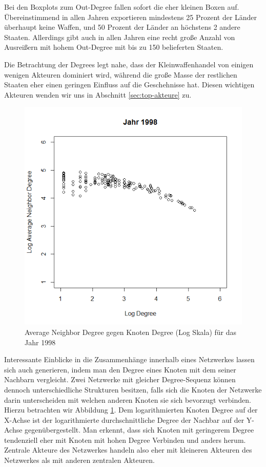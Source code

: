 \documentclass[a4paper,ngerman,oneside,titlepage,bibliography=totoc,11pt]{scrreprt}
\begin{document}
Bei den Boxplots zum Out-Degree fallen sofort die eher kleinen Boxen auf. Übereinstimmend in allen Jahren exportieren mindestens 25 Prozent der Länder überhaupt keine Waffen, und 50 Prozent der Länder an höchstens 2 andere Staaten. Allerdings gibt auch in allen Jahren eine recht große Anzahl von Ausreißern mit hohem Out-Degree mit bis zu 150 belieferten Staaten. 

Die Betrachtung der Degrees legt nahe, dass der Kleinwaffenhandel von einigen wenigen Akteuren dominiert wird, während die große Masse der restlichen Staaten eher einen geringen Einfluss auf die Geschehnisse hat. Diesen wichtigen Akteuren wenden wir uns in Abschnitt \ref{sec:top-akteure} zu.


\begin{figure}[ht]
	\centering
		\includegraphics[width=1.00\textwidth]{Grafiken/and.png}
	\caption{Average Neighbor Degree gegen Knoten Degree (Log Skala) für das Jahr 1998}
	\label{fig:and}
\end{figure}

Interessante Einblicke in die Zusammenhänge innerhalb eines Netzwerkes lassen sich auch generieren, indem man den Degree eines Knoten mit dem seiner Nachbarn vergleicht. Zwei Netzwerke mit gleicher Degree-Sequenz können dennoch unterschiedliche Strukturen besitzen, falls sich die Knoten der Netzwerke darin unterscheiden mit welchen anderen Knoten sie sich bevorzugt verbinden. Hierzu betrachten wir Abbildung \ref{fig:and}. Dem logarithmierten Knoten Degree auf der X-Achse ist der logarithmierte durchschnittliche Degree der Nachbar auf der Y-Achse gegenübergestellt. Man erkennt, dass sich Knoten mit geringerem Degree tendenziell eher mit Knoten mit hohen Degree Verbinden und anders herum. Zentrale Akteure des Netzwerkes handeln also eher mit kleineren Akteuren des Netzwerkes als mit anderen zentralen Akteuren.
\end{document}
